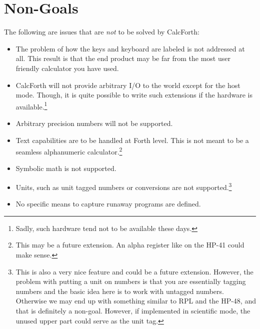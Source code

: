 \documentclass[a4paper]{article}
\begin{document}
\section{Non-Goals}
The following are issues that are {\it not\/} to be solved by CalcForth:
\begin{itemize}
\item The problem of how the keys and keyboard are labeled is not addressed at all. This result is that the end product may be far from the most user friendly calculator you have used.
\item CalcForth will not provide arbitrary I/O to the world except for the host mode. Though, it is quite possible to write such extensions if the hardware is available.\footnote{Sadly, such hardware tend not to be available these days.}
\item Arbitrary precision numbers will not be supported.
\item Text capabilities are to be handled at Forth level. This is not meant to be a seamless alphanumeric calculator.\footnote{This may be a future extension. An alpha register like on the HP-41 could make sense.}
\item Symbolic math is not supported.
\item Units, such as unit tagged numbers or conversions are not supported.\footnote{This is also a very nice feature and could be a future extension. However, the problem with putting a unit on numbers is that you are essentially tagging numbers and the basic idea here is to work with untagged numbers. Otherwise we may end up with something similar to RPL and the HP-48, and that is definitely a non-goal. However, if implemented in scientific mode, the unused upper part could serve as the unit tag.}
\item No specific means to capture runaway programs are defined.
\end{itemize}
\end{document}

